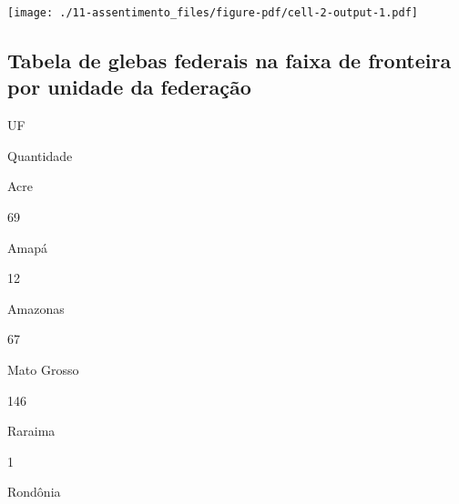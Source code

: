 \documentclass[
  letterpaper,
]{report}
\begin{document}
\texttt{[image: ./11-assentimento\_files/figure-pdf/cell-2-output-1.pdf]}

\hypertarget{tabela-de-glebas-federais-na-faixa-de-fronteira-por-unidade-da-federauxe7uxe3o}{%
\subsection{Tabela de glebas federais na faixa de fronteira por unidade
da
federação}\label{tabela-de-glebas-federais-na-faixa-de-fronteira-por-unidade-da-federauxe7uxe3o}}

\n  

\n    

\n      

UF

\n      

Quantidade

\n    

\n  

\n  

\n    

\n      

Acre

\n      

69

\n    

\n    

\n      

Amapá

\n      

12

\n    

\n    

\n      

Amazonas

\n      

67

\n    

\n    

\n      

Mato Grosso

\n      

146

\n    

\n    

\n      

Raraima

\n      

1

\n    

\n    

\n      

Rondônia
\end{document}

